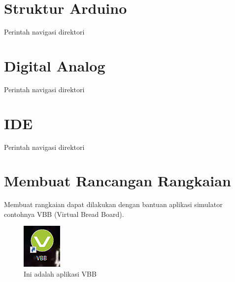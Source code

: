 \section{Struktur Arduino}
Perintah navigasi direktori

\section{Digital Analog}
Perintah navigasi direktori

\section{IDE}
Perintah navigasi direktori

\section{Membuat Rancangan Rangkaian}
    Membuat rangkaian dapat dilakukan dengan bantuan aplikasi simulator contohnya VBB (Virtual Bread Board).
\begin{figure}[!htbp]
  \centering
  \includegraphics[width=.45\textwidth]{figures/VBB/vbb.png}
  \caption{Ini adalah aplikasi VBB}\label{fig:vbb}
\end{figure}

